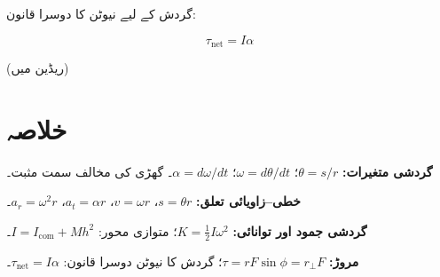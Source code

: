 \documentclass{urdu-textbook}
\begin{document}
گردش کے لیے نیوٹن کا دوسرا قانون:

\[\tau_{\mathrm{net}} = I\alpha\]

(ریڈین میں)

\hypertarget{ux62eux644ux627ux635ux6c1}{%
\section*{خلاصہ}\label{ux62eux644ux627ux635ux6c1}}

\textbf{گردشی متغیرات:} \(\theta = s/r\)؛ \(\omega = d\theta/dt\)؛
\(\alpha = d\omega/dt\)۔ گھڑی کی مخالف سمت مثبت۔

\textbf{خطی--زاویائی تعلق:} \(s = \theta r\)، \(v = \omega r\)،
\(a_t = \alpha r\)، \(a_r = \omega^2 r\)۔

\textbf{گردشی جمود اور توانائی:} \(K = \tfrac{1}{2}I\omega^2\)؛ متوازی
محور: \(I = I_{\mathrm{com}} + Mh^2\)۔

\textbf{مروڑ:} \(\tau = rF\sin\phi = r_\perp F\)؛ گردش کا نیوٹن دوسرا
قانون: \(\tau_{\mathrm{net}} = I\alpha\)۔

\clearpage
\end{document}
